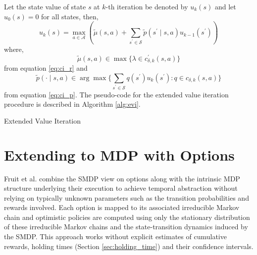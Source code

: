 Let the state value of state $s$ at $k$-th iteration be denoted by $u_k(s)$ and let $u_0(s) = 0$ for all states, then,
\begin{equation}
    u_k(s) = \max_{a \in \mathcal{A}} \left( \tilde{\mu}(s,a) + \sum_{s^\prime \in \mathcal{S}} {\tilde{p}(s^\prime \mid s, a) u_{k-1}(s^\prime)} \right)
\end{equation}
where, 
$$\tilde{\mu}(s,a) \in \max \{ \lambda \in c^\prime_{\delta, k} (s,a) \}$$
from equation \ref{eq:ci_r} and 
$$\tilde{p}(\cdot \mid s, a) \in \arg\max \{ \sum_{s^\prime \in \mathcal{S}} {q(s^\prime) u_k(s^\prime) : q \in c_{\delta, k} (s,a)} \}$$ 
from equation  \ref{eq:ci_p}.
The pseudo-code for the extended value iteration procedure is described in Algorithm \ref{alg:evi}.

\begin{algorithm}
\caption{Extended Value Iteration}\label{alg:evi}



\BlankLine
{}
\BlankLine
{}
\end{algorithm}

\section{Extending to MDP with Options}

Fruit et al. \cite{fruit_exploration--exploitation_2017, fruit_regret_2017} combine the SMDP view on options along with the intrinsic MDP structure underlying their execution to achieve temporal abstraction without relying on typically unknown parameters such as the transition probabilities and rewards involved.
Each option is mapped to its associated irreducible Markov chain and optimistic policies are computed using only the stationary distribution of these irreducible Markov chains and the state-transition dynamics induced by the SMDP. 
This approach works without explicit estimates of cumulative rewards, holding times (Section \ref{sec:holding_time}) and their confidence intervals.

